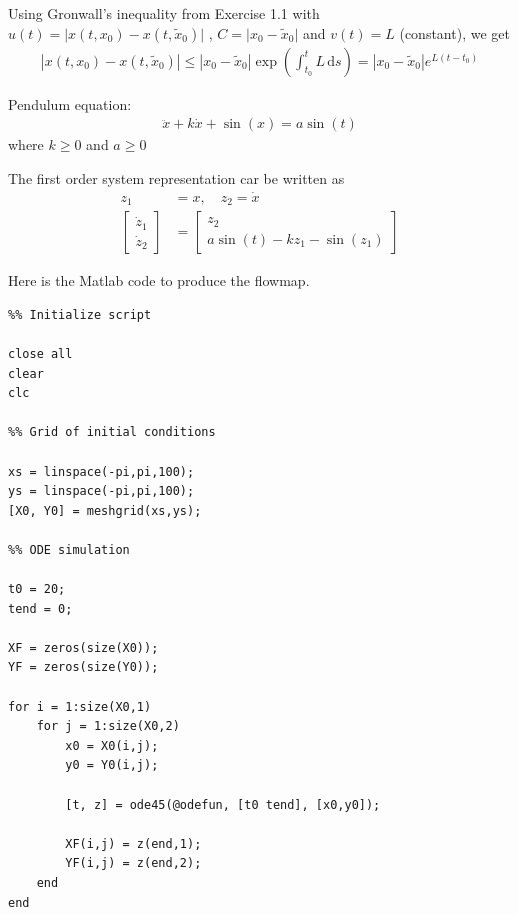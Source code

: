 \begin{solution}[2.1]
\begin{enumerate}
Using Gronwall's inequality from Exercise 1.1 with
$u(t) = \vert x(t,x_0) - x(t,\tilde{x}_0) \vert$ , $C = \vert x_0 - \tilde{x}_0 \vert$ and $v(t) = L$ (constant), we get
\begin{align}
	\left\vert x(t,x_0) - x(t,\tilde{x}_0) \right\vert \leq \left\vert x_0 - \tilde{x}_0 \right\vert \exp \left( \int_{t_0}^t L\,\text{d}s \right) = \left\vert x_0 - \tilde{x}_0 \right\vert e^{L(t-t_0)}
\end{align}

\end{enumerate}
\end{solution}


\begin{solution}[2.2]
Pendulum equation:
\begin{align}
	\ddot{x} + k\dot{x} + \sin(x) = a \sin(t)
\end{align}
where $k \geq 0$ and $a \geq 0$

The first order system representation car be written as
\begin{align}
	z_1 &= x, \quad z_2 = \dot{x} \\
	\begin{bmatrix}
		\dot{z}_1 \\
		\dot{z}_2
	\end{bmatrix} &= \begin{bmatrix}
		z_2 \\
		a\sin(t) - kz_1 - \sin(z_1)
	\end{bmatrix}
\end{align}

Here is the Matlab code to produce the flowmap. 
\begin{verbatim}
%% Initialize script

close all
clear
clc

%% Grid of initial conditions

xs = linspace(-pi,pi,100);
ys = linspace(-pi,pi,100);
[X0, Y0] = meshgrid(xs,ys);

%% ODE simulation

t0 = 20;
tend = 0;

XF = zeros(size(X0));
YF = zeros(size(Y0));

for i = 1:size(X0,1)
    for j = 1:size(X0,2)
        x0 = X0(i,j);
        y0 = Y0(i,j);
        
        [t, z] = ode45(@odefun, [t0 tend], [x0,y0]);
        
        XF(i,j) = z(end,1);
        YF(i,j) = z(end,2);
    end
end


\end{verbatim}
\end{solution}
